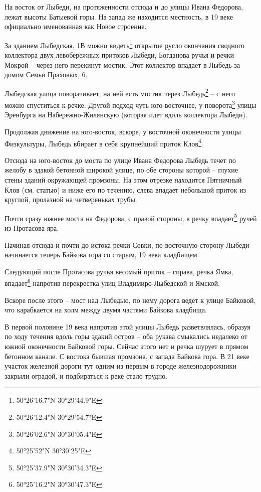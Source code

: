 На восток от Лыбеди, на протяженности отсюда и до улицы Ивана Федорова, лежат высоты Батыевой горы. На запад же находится местность, в 19 веке официально именованная как Новое строение.

За зданием Лыбедская, 1В можно видеть\footnote{50°26'16.7"N 30°29'44.9"E} открытое русло окончания сводного коллектора двух левобережных притоков Лыбеди, Богданова ручья и речки Мокрой – через него перекинут мостик. Этот коллектор впадает в Лыбедь за домом Семьи Праховых, 6.

Лыбедская улица поворачивает, на ней есть мостик через Лыбедь\footnote{50°26'12.4"N 30°29'54.7"E} – с него можно спуститься к речке. Другой подход чуть юго-восто\-чнее, у поворота\footnote{50°26'02.6"N 30°30'05.4"E} улицы Эренбурга на Набе\-режно-Жилянскую (которая идет вдоль коллектора Лыбеди).

Продолжая движение на юго-восток, вскоре, у восточной оконечности улицы Физкультуры, Лыбедь вбирает в себя крупнейший приток Клов\footnote{50°25'52"N 30°30'25"E}.

Отсюда на юго-восток до моста по улице Ивана Федорова Лыбедь течет по желобу в эдакой бетонной широкой улице, по обе стороны которой – глухие стены зданий окружающей промзоны. На этом отрезке находится Пятничный Клов (см. статью) и ниже его по течению, слева впадает небольшой приток из круглой, пролазной на четвереньках трубы. 

Почти сразу южнее моста на Федорова, с правой стороны, в речку впадает\footnote{50°25'37.9"N 30°30'34.3"E} ручей из Протасова яра.

Начиная отсюда и почти до истока речки Совки, по восточную сторону Лыбеди начинается теперь Байкова гора со старым, 19 века кладбищем.

Следующий после Протасова ручья весомый приток – справа, речка Ямка, впадает\footnote{50°25'16.2"N 30°30'47.3"E} напротив перекрестка улиц Владимиро-Лыбедской и Ямской.

Вскоре после этого – мост над Лыбедью, по нему дорога ведет к улице Байковой, что карабкается на холм между двумя частями Байкова кладбища.

В первой половине 19 века напротив этой улицы Лыбедь разветвлялась, образуя по ходу течения вдоль горы эдакий остров – оба рукава смыкались недалеко от южной оконечности Байковой горы. Сейчас этого нет и речка шурует в прямом бетонном канале. С востока бывшая промзона, с запада Байкова гора. В 21 веке участок железной дороги тут одним из первым в городе железнодорожники закрыли оградой, и подбираться к реке стало трудно.

